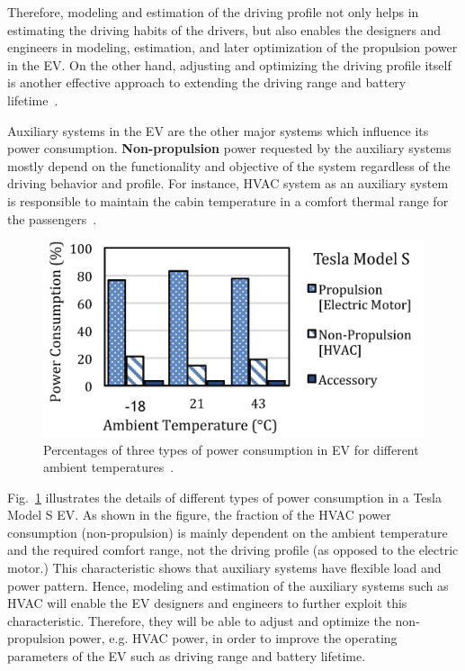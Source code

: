 Therefore, modeling and estimation of the driving profile not only helps in estimating the driving habits of the drivers, but also enables the designers and engineers in modeling, estimation, and later optimization of the propulsion power in the EV. On the other hand, adjusting and optimizing the driving profile itself is another effective approach to extending the driving range and battery lifetime~\cite{AF_11}. 

Auxiliary systems in the EV are the other major systems which influence its power consumption. \textbf{Non-propulsion} power requested by the auxiliary systems mostly depend on the functionality and objective of the system regardless of the driving behavior and profile. For instance, HVAC system as an auxiliary system is responsible to maintain the cabin temperature in a comfort thermal range for the passengers~\cite{AF_13,AF_14,AF_15,AF_16}.

\begin{figure}
\centering
\includegraphics[width=0.7\hsize]{Figures/Al_Faruque/AF_figure2.jpeg}
\caption{Percentages of three types of power consumption in EV for different ambient temperatures~\cite{AF_1,AF_10}.}
\label{AF_image2}
\end{figure}      

Fig.~\ref{AF_image2} illustrates the details of different types of power consumption in a Tesla Model S EV. As shown in the figure, the fraction of the HVAC power consumption (non-propulsion) is mainly dependent on the ambient temperature and the required comfort range, not the driving profile (as opposed to the electric motor.) This characteristic shows that auxiliary systems have flexible load and power pattern. Hence, modeling and estimation of the auxiliary systems such as HVAC will enable the EV designers and engineers to further exploit this characteristic. Therefore, they will be able to adjust and optimize the non-propulsion power, e.g. HVAC power, in order to improve the operating parameters of the EV such as driving range and battery lifetime.

